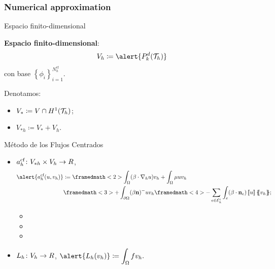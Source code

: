 	\subsubsection{Numerical approximation}
	
	\begin{frame}{Espacio finito-dimensional}
	
	\textbf{Espacio finito-dimensional}: $$V_h\coloneqq\alert{\mathbb{P}_k^d(\T_h)}$$ con base $\left\{\phi_i\right\}_{i=1}^{N_h^{\text{cf}}}$.
	\vspace*{1cm}
	
	Denotamos:
	\begin{itemize}
		\item $V_*\coloneqq V\cap H^1(\mathcal{T}_h)$;
		\item $V_{*h}\coloneqq V_*+V_h$.
	\end{itemize}
	\end{frame}
	
	\begin{frame}{Método de los Flujos Centrados}
	\begin{itemize}\itemsep1em
		\item $a_h^{\text{cf}}\colon V_{*h}\times V_h\to\relax R$,
		\begin{align*}
		\alert{\acf{u}{v_h}}&\coloneqq\framedmath<2>{\displaystyle \int_\Omega(\beta\cdot\nabla_h u)v_h+\int_\Omega\mu u v_h}\\&\framedmath<3>{\displaystyle +\int_{\partial\Omega}(\beta\mathbf{n})^-uv_h}\framedmath<4>{\displaystyle -\sum_{e\in\E_h^i}\int_e(\beta\cdot\mathbf{n}_e)\salto{u}\media{v_h}};
		\end{align*}
		\begin{itemize}
			\item<2> 
			\item<3> 
			\item<4> 
		\end{itemize}
		\item $L_h\colon V_h\to\relax R$, $\displaystyle \alert{L_h(v_h)}\coloneqq\int_\Omega f v_h.$
	\end{itemize}
\end{frame}


